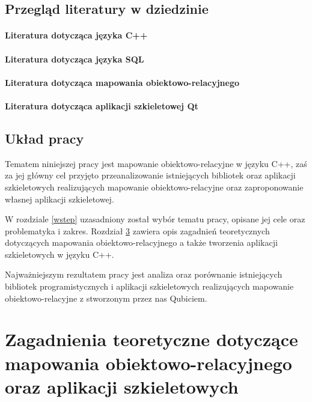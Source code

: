 \documentclass[12pt]{report}
\begin{document}
\section{Przegląd literatury w dziedzinie}

\subsubsection{Literatura dotycząca języka C++}

\subsubsection{Literatura dotycząca języka SQL}

\subsubsection{Literatura dotycząca mapowania obiektowo-relacyjnego}

\subsubsection{Literatura dotycząca aplikacji szkieletowej Qt}

\section{Układ pracy} %

Tematem niniejszej pracy jest mapowanie obiektowo-relacyjne w języku C++, zaś za jej główny cel przyjęto przeanalizowanie istniejących bibliotek oraz aplikacji szkieletowych
realizujących mapowanie obiektowo-relacyjne oraz zaproponowanie własnej aplikacji szkieletowej.

W rozdziale \ref{wstep} uzasadniony został wybór tematu pracy, opisane jej cele oraz problematyka i zakres. Rozdział \ref{teoria} zawiera opis zagadnień teoretycznych
do\-ty\-czą\-cych mapowania obiektowo-relacyjnego a także tworzenia aplikacji szkieletowych w języku C++.

Najważniejszym rezultatem pracy jest analiza oraz porównanie istniejących bibliotek programistycznych i aplikacji szkieletowych realizujących mapowanie obiekt\-owo-rel\-acyjne
z stworzonym przez nas Qubiciem.

\chapter[Zagadnienia teoretyczne]{Zagadnienia teoretyczne dotyczące mapowania obiektowo-relacyjnego oraz aplikacji szkieletowych} \label{teoria}
\end{document}

